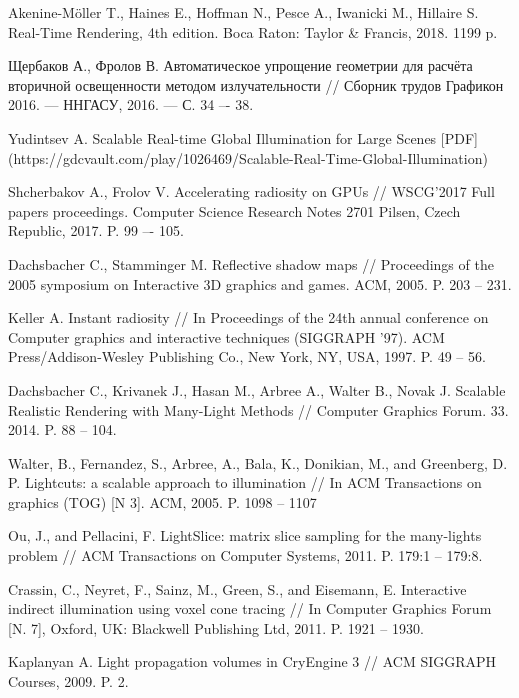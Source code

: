 \documentclass[oneside,final,12pt, a4paper]{extreport}
\begin{document}
\begin{thebibliography}{00}

 Akenine-Möller T., Haines E., Hoffman N., Pesce A., Iwanicki M., Hillaire S. Real-Time Rendering, 4th edition. Boca Raton: Taylor \& Francis, 2018. 1199 p.

 Щербаков А., Фролов В. Автоматическое упрощение геометрии для расчёта вторичной освещенности методом излучательности // Сборник трудов Графикон 2016. — ННГАСУ, 2016. — С. 34 –- 38.

 Yudintsev A. Scalable Real-time Global Illumination for Large Scenes [PDF] (https://gdcvault.com/play/1026469/Scalable-Real-Time-Global-Illumination)

 Shcherbakov A., Frolov V. Accelerating radiosity on GPUs // WSCG'2017 Full papers proceedings. Computer Science Research Notes 2701 Pilsen, Czech Republic, 2017. P. 99 –- 105.

 Dachsbacher C., Stamminger M. Reflective shadow maps // Proceedings of the 2005 symposium on Interactive 3D graphics and games. ACM, 2005. P. 203 -- 231.

 Keller A. Instant radiosity // In Proceedings of the 24th annual conference on Computer graphics and interactive techniques (SIGGRAPH '97). ACM Press/Addison-Wesley Publishing Co., New York, NY, USA, 1997. P. 49 -- 56. 

 Dachsbacher C., Krivanek J., Hasan M., Arbree A., Walter B., Novak J. Scalable Realistic Rendering with Many-Light Methods // Computer Graphics Forum. 33. 2014. P. 88 -- 104.

 Walter, B., Fernandez, S., Arbree, A., Bala, K., Donikian, M., and Greenberg, D. P. Lightcuts: a scalable approach to illumination // In ACM Transactions on graphics (TOG) [N 3]. ACM, 2005. P. 1098 -- 1107

 Ou, J., and Pellacini, F. LightSlice: matrix slice sampling for the many-lights problem // ACM Transactions on Computer Systems, 2011. P. 179:1 -- 179:8.

 Crassin, C., Neyret, F., Sainz, M., Green, S., and Eisemann, E. Interactive indirect illumination using voxel cone tracing // In Computer Graphics Forum [N. 7], Oxford, UK: Blackwell Publishing Ltd, 2011. P. 1921 -- 1930.

 Kaplanyan A. Light propagation volumes in CryEngine 3 // ACM SIGGRAPH Courses, 2009. P. 2.


\end{thebibliography}
\end{document}
